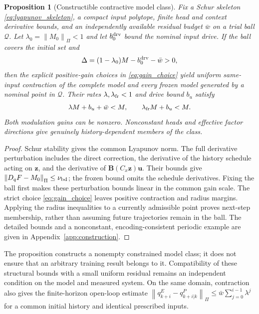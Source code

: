 \documentclass[journal]{IEEEtran}
\newtheorem{proposition}{Proposition}
\newcommand{\vu}{\mathbf{u}}
\newcommand{\vz}{\mathbf{z}}
\newcommand{\mB}{\mathbf{B}}
\newcommand{\norm}[1]{\left\lVert #1\right\rVert}
\begin{document}
\begin{proposition}[Constructible contractive model class]
\label{prop:contractive_class}
Fix a Schur skeleton \eqref{eq:lyapunov_skeleton}, a compact input polytope, finite head and context derivative bounds, and an independently available residual budget $\bar w$ on a trial ball $\mathcal Q$. Let $\lambda_0=\norm{M_0}_\Pi<1$ and let $b_0^{\rm drv}$ bound the nominal input drive. If the ball covers the initial set and
\begin{equation}
\Delta=(1-\lambda_0)M-b_0^{\rm drv}-\bar w>0,
\label{eq:radius_margin}
\end{equation}
then the explicit positive-gain choices in \eqref{eq:gain_choice} yield uniform same-input contraction of the complete model and every frozen model generated by a nominal point in $\mathcal Q$. Their rates $\lambda,\lambda_{\rm fr}<1$ and drive bound $b_u$ satisfy
\begin{equation}
\lambda M+b_u+\bar w<M,\qquad \lambda_{\rm fr}M+b_u<M.
\label{eq:invariant_radius}
\end{equation}
Both modulation gains can be nonzero. Nonconstant heads and effective factor directions give genuinely history-dependent members of the class.
\end{proposition}
\begin{proof}
Schur stability gives the common Lyapunov norm. The full derivative perturbation includes the direct correction, the derivative of the history schedule acting on $\vz$, and the derivative of $\mB(C_x\vz)\vu$. Their bounds give $\norm{D_qF-M_0}_\Pi\le\nu_{\rm bd}$; the frozen bound omits the schedule derivatives. Fixing the ball first makes these perturbation bounds linear in the common gain scale. The strict choice \eqref{eq:gain_choice} leaves positive contraction and radius margins. Applying the radius inequalities to a currently admissible point proves next-step membership, rather than assuming future trajectories remain in the ball. The detailed bounds and a nonconstant, encoding-consistent periodic example are given in Appendix~\ref{app:construction}.
\end{proof}

The proposition constructs a nonempty constrained model class; it does not ensure that an arbitrary training result belongs to it. Compatibility of these structural bounds with a small uniform residual remains an independent condition on the model and measured system. On the same domain, contraction also gives the finite-horizon open-loop estimate $\norm{q_{k+i}^E-q_{k+i|k}^P}_\Pi\le\bar w\sum_{j=0}^{i-1}\lambda^j$ for a common initial history and identical prescribed inputs.
\end{document}

